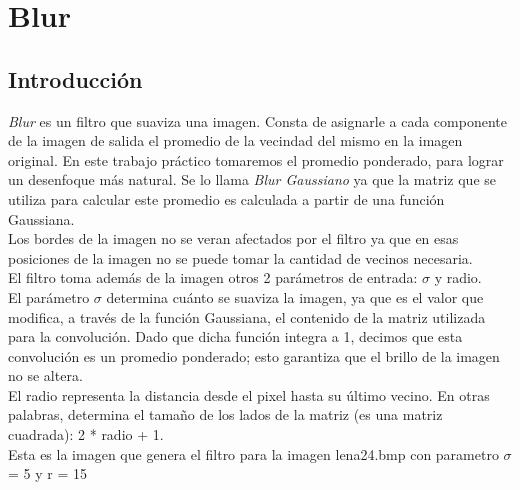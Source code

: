 \documentclass[10pt,a4paper,spanish]{article}
\begin{document}
\section{Blur}

\subsection{Introducción}

\textit{Blur} es un filtro que suaviza una imagen. Consta de asignarle a cada componente de la imagen de salida el promedio de la vecindad del mismo en la imagen original. En este trabajo práctico tomaremos el promedio ponderado, para lograr un desenfoque más natural. Se lo llama \textit{Blur Gaussiano} ya que la matriz que se utiliza para calcular este promedio es calculada a partir de una función Gaussiana. \\

Los bordes de la imagen no se veran afectados por el filtro ya que en esas posiciones de la imagen no se puede tomar la cantidad de vecinos necesaria. \\

El filtro toma además de la imagen otros 2 parámetros de entrada: $ \sigma $ y radio. \\

El parámetro $ \sigma $ determina cuánto se suaviza la imagen, ya que es el valor que modifica, a través de la función Gaussiana, el contenido de la matriz utilizada para la convolución. Dado que dicha función integra a 1, decimos que esta convolución es un promedio ponderado; esto garantiza que el brillo de la imagen no se altera.\\

El radio representa la distancia desde el pixel hasta su último vecino. En otras palabras, determina el tamaño de los lados de la matriz (es una matriz cuadrada): 2 * radio + 1. \\

Esta es la imagen que genera el filtro para la imagen lena24.bmp con parametro $ \sigma $ = 5 y r = 15 \\
\end{document}
